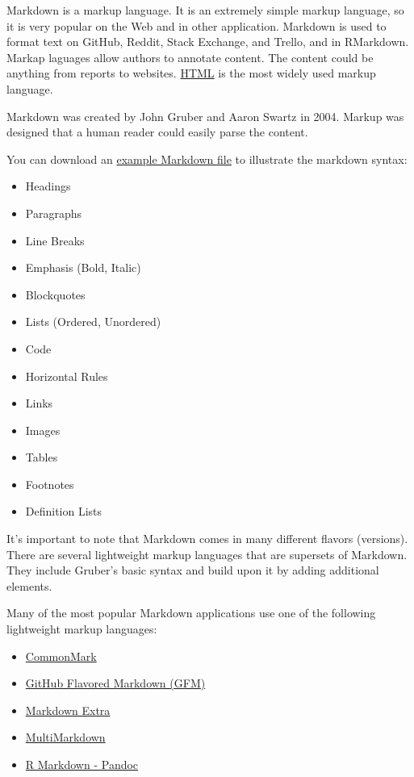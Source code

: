\documentclass[
]{book}
\providecommand{\tightlist}{%
  \setlength{\itemsep}{0pt}\setlength{\parskip}{0pt}}
\begin{document}
Markdown is a markup language. It is an extremely simple markup language, so it is very popular on the Web and in other application. Markdown is used to format text on GitHub, Reddit, Stack Exchange, and Trello, and in RMarkdown.
Markap laguages allow authors to annotate content. The content could be anything from reports to websites. \href{https://www.w3schools.com/html/default.asp}{HTML} is the most widely used markup language.

Markdown was created by John Gruber and Aaron Swartz in 2004. Markup was designed that a human reader could easily parse the content.

You can download an \href{markdown_syntax.md}{example Markdown file} to illustrate the markdown syntax:

\begin{itemize}
\tightlist
\item
  Headings
\item
  Paragraphs
\item
  Line Breaks
\item
  Emphasis (Bold, Italic)
\item
  Blockquotes
\item
  Lists (Ordered, Unordered)
\item
  Code
\item
  Horizontal Rules
\item
  Links
\item
  Images
\item
  Tables
\item
  Footnotes
\item
  Definition Lists
\end{itemize}

It's important to note that Markdown comes in many different flavors (versions). There are several lightweight markup languages that are supersets of Markdown. They include Gruber's basic syntax and build upon it by adding additional elements.

Many of the most popular Markdown applications use one of the following lightweight markup languages:

\begin{itemize}
\item
  \href{https://commonmark.org/}{CommonMark}
\item
  \href{https://github.github.com/gfm/}{GitHub Flavored Markdown (GFM)}
\item
  \href{https://michelf.ca/projects/php-markdown/extra/}{Markdown Extra}
\item
  \href{https://fletcherpenney.net/multimarkdown/}{MultiMarkdown}
\item
  \href{https://rmarkdown.rstudio.com/}{R Markdown - Pandoc}
\end{itemize}
\end{document}
